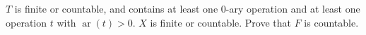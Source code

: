 $T$ is finite or countable, and contains at least one $0$-ary operation and at least one operation $t$ with $\operatorname{ar}(t) > 0$. $X$ is finite or countable. Prove that $F$ is countable.
